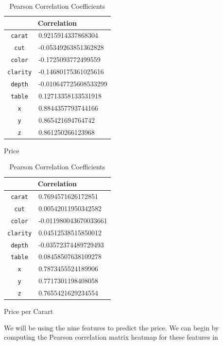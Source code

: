 \documentclass[11pt,letterpaper]{article}
\begin{document}
\begin{table}[H]
\begin{subtable}[H]{0.45\textwidth}
    \begin{tabular}{c l}
        \hline
        \multicolumn{2}{c}{Correlation}         \\
        \hline 
    \texttt{carat}   & 0.9215914337868304    \\
    \texttt{cut}     & -0.05349263851362828  \\
    \texttt{color}   & -0.1725093772499559   \\
    \texttt{clarity} & -0.14680175361025616  \\
    \texttt{depth}   & -0.010647725608533299 \\
    \texttt{table}   & 0.12713358133531918   \\
    \texttt{x}       & 0.8844357793744166    \\
    \texttt{y}       & 0.865421694764742     \\
    \texttt{z}       & 0.861250266123968    \\
    \end{tabular}
    \caption{Price}
    \end{subtable}
    \begin{subtable}[H]{0.45\textwidth}
        \begin{tabular}{c l}
            \hline
            \multicolumn{2}{c}{Correlation}         \\
            \hline 
        \texttt{carat}   & 0.7694571626172851    \\
        \texttt{cut}     & 0.00542011950342582   \\
        \texttt{color}   & -0.011980043670033661 \\
        \texttt{clarity} & 0.04512538515850012   \\
        \texttt{depth}   & -0.03572374489729493  \\
        \texttt{table}   & 0.08458507638109278   \\
        \texttt{x}       & 0.7873455524189906    \\
        \texttt{y}       & 0.7717301198408058    \\
        \texttt{z}       & 0.7655421629234554   \\
    
        \end{tabular}
        \caption{Price per Carart}
    \end{subtable}
    \caption{Pearson Correlation Coefficients}
\end{table}
We will be using the nine features to predict the price. We can begin by 
computing the Pearson correlation matrix heatmap for these features in 
\end{document}

